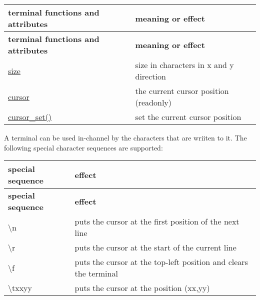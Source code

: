 \tabulinesep=1mm
\begin{longtabu} spread 0pt [c]{*{2}{|X[-1]}|}
\hline
\rowcolor{\tableheadbgcolor}\textbf{ terminal functions and attributes }&\textbf{ meaning or effect  }\\
\endfirsthead
\hline
\endfoot
\hline
\rowcolor{\tableheadbgcolor}\textbf{ terminal functions and attributes }&\textbf{ meaning or effect  }\\
\endhead
\hyperlink{classhwlib_1_1terminal_ae9a152d0d8d1c1e0de12e9f363e46224}{size} &size in characters in x and y direction \\
\hyperlink{classhwlib_1_1terminal_aeb11ed01f6b2dff73d624ae17955a32e}{cursor} &the current cursor position (readonly) \\
\hyperlink{classhwlib_1_1terminal_ad03a78feb552449609cacd9ffce4cb6e}{cursor\+\_\+set()} &set the current cursor position \\
\end{longtabu}
A terminal can be used \textquotesingle{}in-\/channel\textquotesingle{} by the characters that are wriiten to it. The following special character sequences are supported\+:

\tabulinesep=1mm
\begin{longtabu} spread 0pt [c]{*{2}{|X[-1]}|}
\hline
\rowcolor{\tableheadbgcolor}\textbf{ special sequence }&\textbf{ effect  }\\
\endfirsthead
\hline
\endfoot
\hline
\rowcolor{\tableheadbgcolor}\textbf{ special sequence }&\textbf{ effect  }\\
\endhead
\textquotesingle{}\textbackslash{}n\textquotesingle{} &puts the cursor at the first position of the next line \\
\textquotesingle{}\textbackslash{}r\textquotesingle{} &puts the cursor at the start of the current line \\
\textquotesingle{}\textbackslash{}f\textquotesingle{} &puts the cursor at the top-\/left position and clears the terminal \\
\textquotesingle{}\textbackslash{}txxyy\textquotesingle{} &puts the cursor at the position (xx,yy) \\
\end{longtabu}
~\newline
 
